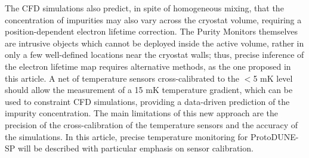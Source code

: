 The CFD simulations also predict, in spite of homogeneous mixing, that the concentration of impurities may also vary across the cryostat volume, requiring a position-dependent electron lifetime correction. The Purity Monitors themselves are intrusive objects which cannot be deployed inside the active volume, rather in only a few well-defined locations near the cryostat walls; thus, precise inference of the electron lifetime map requires alternative methods, as the one proposed in this article. A net of temperature sensors cross-calibrated to the $<$5 mK level should allow the measurement of a 15 mK temperature gradient, which can be used to constraint CFD simulations, providing a data-driven prediction of the impurity concentration. The main limitations of this new approach are the precision of the cross-calibration of the temperature sensors and the accuracy of the simulations. In this article, precise temperature monitoring for ProtoDUNE-SP will be described with particular emphasis on sensor calibration.

